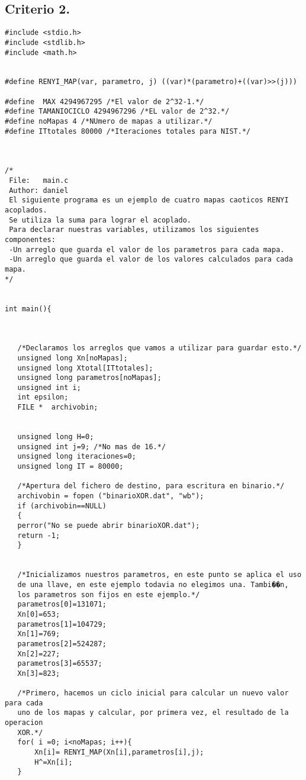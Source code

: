 \documentclass[12pt,3p]{elsarticle}
\begin{document}
\subsection{Criterio 2.}
\begin{verbatim}
#include <stdio.h>
#include <stdlib.h>
#include <math.h>


#define RENYI_MAP(var, parametro, j) ((var)*(parametro)+((var)>>(j)))

#define  MAX 4294967295 /*El valor de 2^32-1.*/
#define TAMANIOCICLO 4294967296 /*EL valor de 2^32.*/
#define noMapas 4 /*NUmero de mapas a utilizar.*/
#define ITtotales 80000 /*Iteraciones totales para NIST.*/



/*
 File:   main.c
 Author: daniel
 El siguiente programa es un ejemplo de cuatro mapas caoticos RENYI acoplados.
 Se utiliza la suma para lograr el acoplado.
 Para declarar nuestras variables, utilizamos los siguientes componentes:
 -Un arreglo que guarda el valor de los parametros para cada mapa.
 -Un arreglo que guarda el valor de los valores calculados para cada mapa.
*/


int main(){

  
 
   /*Declaramos los arreglos que vamos a utilizar para guardar esto.*/
   unsigned long Xn[noMapas];
   unsigned long Xtotal[ITtotales]; 
   unsigned long parametros[noMapas];
   unsigned int i;
   int epsilon;
   FILE *  archivobin; 
  

   unsigned long H=0; 
   unsigned int j=9; /*No mas de 16.*/
   unsigned long iteraciones=0;
   unsigned long IT = 80000;

   /*Apertura del fichero de destino, para escritura en binario.*/
   archivobin = fopen ("binarioXOR.dat", "wb");
   if (archivobin==NULL)
   {
   perror("No se puede abrir binarioXOR.dat");
   return -1;
   }
   

   /*Inicializamos nuestros parametros, en este punto se aplica el uso
   de una llave, en este ejemplo todavia no elegimos una. Tambi��n,
   los parametros son fijos en este ejemplo.*/
   parametros[0]=131071;
   Xn[0]=653;
   parametros[1]=104729;
   Xn[1]=769;
   parametros[2]=524287;
   Xn[2]=227;
   parametros[3]=65537;
   Xn[3]=823;
                   
   /*Primero, hacemos un ciclo inicial para calcular un nuevo valor para cada
   uno de los mapas y calcular, por primera vez, el resultado de la operacion
   XOR.*/
   for( i =0; i<noMapas; i++){
       Xn[i]= RENYI_MAP(Xn[i],parametros[i],j);
       H^=Xn[i];
   }
   

\end{verbatim}
\end{document}
